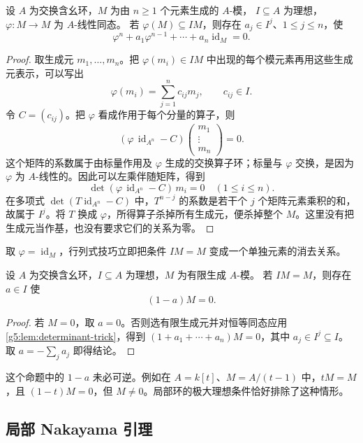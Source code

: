 \begin{lemma}[行列式技巧]\label{g5:lem:determinant-trick}
	设 \(A\) 为交换含幺环，\(M\) 为由 \(n\geq1\) 个元素生成的 \(A\)-模， \(I\subseteq A\) 为理想，\(\varphi:M\to M\) 为 \(A\)-线性同态。 若 \(\varphi(M)\subseteq IM\)，则存在 \(a_j\in I^j\)、\(1\leq j\leq n\)，使
	\[
	\varphi^n+a_1\varphi^{n-1}+\cdots+a_n\operatorname{id}_M=0.
	\]
\end{lemma}
\begin{proof}
	取生成元 \(m_1,\ldots,m_n\)。把 \(\varphi(m_i)\in IM\) 中出现的每个模元素再用这些生成元表示，可以写出
	\[
	\varphi(m_i)=\sum_{j=1}^n c_{ij}m_j,\qquad c_{ij}\in I.
	\]
	令 \(C=(c_{ij})\)。把 \(\varphi\) 看成作用于每个分量的算子，则
	\[
	(\varphi\,\operatorname{id}_{A^n}-C)
	\begin{pmatrix}m_1\\ \vdots\\m_n\end{pmatrix}=0.
	\]
	这个矩阵的系数属于由标量作用及 \(\varphi\) 生成的交换算子环；标量与 \(\varphi\) 交换，是因为 \(\varphi\) 为 \(A\)-线性的。因此可以左乘伴随矩阵，得到
	\[
	\det(\varphi\,\operatorname{id}_{A^n}-C)\,m_i=0
	\quad(1\leq i\leq n).
	\]
	在多项式 \(\det(T\operatorname{id}_{A^n}-C)\) 中，\(T^{n-j}\) 的系数是若干个 \(j\) 个矩阵元素乘积的和，故属于 \(I^j\)。将 \(T\) 换成 \(\varphi\)，所得算子杀掉所有生成元，便杀掉整个 \(M\)。这里没有把生成元当作基，也没有要求它们的关系为零。
\end{proof}

取 \(\varphi=\operatorname{id}_M\)，行列式技巧立即把条件 \(IM=M\) 变成一个单独元素的消去关系。

\begin{proposition}\label{g5:prop:nakayama-ideal}
	设 \(A\) 为交换含幺环，\(I\subseteq A\) 为理想，\(M\) 为有限生成 \(A\)-模。 若 \(IM=M\)，则存在 \(a\in I\) 使
	\[
	(1-a)M=0.
	\]
\end{proposition}
\begin{proof}
	若 \(M=0\)，取 \(a=0\)。否则选有限生成元并对恒等同态应用\cref{g5:lem:determinant-trick}，得到 \((1+a_1+\cdots+a_n)M=0\)，其中 \(a_j\in I^j\subseteq I\)。 取 \(a=-\sum_j a_j\) 即得结论。
\end{proof}

这个命题中的 \(1-a\) 未必可逆。例如在 \(A=k[t]\)、\(M=A/(t-1)\) 中，\(tM=M\)，且 \((1-t)M=0\)，但 \(M\ne0\)。局部环的极大理想条件恰好排除了这种情形。

\subsection{局部 Nakayama 引理}
\label{g5:subsec:0203:02}

